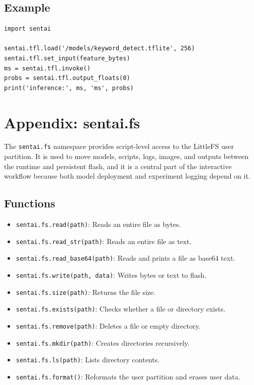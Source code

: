 \subsection{Example}\label{example-3}

\begin{verbatim}
import sentai

sentai.tfl.load('/models/keyword_detect.tflite', 256)
sentai.tfl.set_input(feature_bytes)
ms = sentai.tfl.invoke()
probs = sentai.tfl.output_floats(0)
print('inference:', ms, 'ms', probs)
\end{verbatim}

\section{Appendix: sentai.fs}\label{appendix-sentai.fs}

The \texttt{sentai.fs} namespace provides script-level access to the
LittleFS user partition. It is used to move models, scripts, logs,
images, and outputs between the runtime and persistent flash, and it is
a central part of the interactive workflow because both model deployment
and experiment logging depend on it.

\subsection{Functions}\label{functions-4}

\begin{itemize}
\tightlist
\item
  \texttt{sentai.fs.read(path)}: Reads an entire file as bytes.
\item
  \texttt{sentai.fs.read\_str(path)}: Reads an entire file as text.
\item
  \texttt{sentai.fs.read\_base64(path)}: Reads and prints a file as
  base64 text.
\item
  \texttt{sentai.fs.write(path,\ data)}: Writes bytes or text to flash.
\item
  \texttt{sentai.fs.size(path)}: Returns the file size.
\item
  \texttt{sentai.fs.exists(path)}: Checks whether a file or directory
  exists.
\item
  \texttt{sentai.fs.remove(path)}: Deletes a file or empty directory.
\item
  \texttt{sentai.fs.mkdir(path)}: Creates directories recursively.
\item
  \texttt{sentai.fs.ls(path)}: Lists directory contents.
\item
  \texttt{sentai.fs.format()}: Reformats the user partition and erases
  user data.
\end{itemize}

